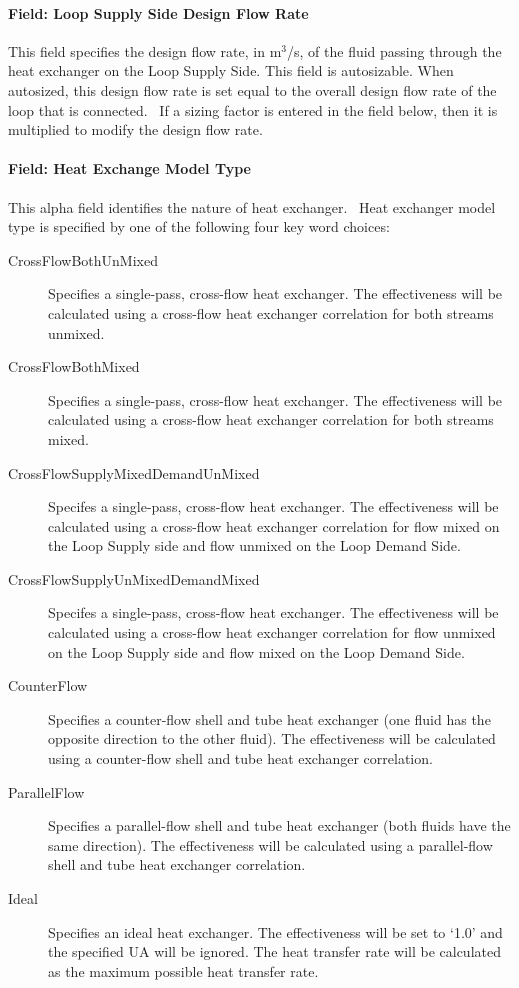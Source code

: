 \paragraph{Field: Loop Supply Side Design Flow Rate}\label{field-loop-supply-side-design-flow-rate}

This field specifies the design flow rate, in m\(^{3}\)/s, of the fluid passing through the heat exchanger on the Loop Supply Side. This field is autosizable. When autosized, this design flow rate is set equal to the overall design flow rate of the loop that is connected.~ If a sizing factor is entered in the field below, then it is multiplied to modify the design flow rate.

\paragraph{Field: Heat Exchange Model Type}\label{field-heat-exchange-model-type}

This alpha field identifies the nature of heat exchanger.~ Heat exchanger model type is specified by one of the following four key word choices:

\begin{description}
\item [CrossFlowBothUnMixed] Specifies a single-pass, cross-flow heat exchanger. The effectiveness will be calculated using a cross-flow heat exchanger correlation for both streams unmixed.
\item [CrossFlowBothMixed]  Specifies a single-pass, cross-flow heat exchanger. The effectiveness will be calculated using a cross-flow heat exchanger correlation for both streams mixed.
\item [CrossFlowSupplyMixedDemandUnMixed] Specifes a single-pass, cross-flow heat exchanger. The effectiveness will be calculated using a cross-flow heat exchanger correlation for flow mixed on the Loop Supply side and flow unmixed on the Loop Demand Side.
\item [CrossFlowSupplyUnMixedDemandMixed] Specifes a single-pass, cross-flow heat exchanger. The effectiveness will be calculated using a cross-flow heat exchanger correlation for flow unmixed on the Loop Supply side and flow mixed on the Loop Demand Side.
\item [CounterFlow] Specifies a counter-flow shell and tube heat exchanger (one fluid has the opposite direction to the other fluid). The effectiveness will be calculated using a counter-flow shell and tube heat exchanger correlation.
\item [ParallelFlow] Specifies a parallel-flow shell and tube heat exchanger (both fluids have the same direction). The effectiveness will be calculated using a parallel-flow shell and tube heat exchanger correlation.
\item [Ideal] Specifies an ideal heat exchanger. The effectiveness will be set to `1.0' and the specified UA will be ignored. The heat transfer rate will be calculated as the maximum possible heat transfer rate.
\end{description}


